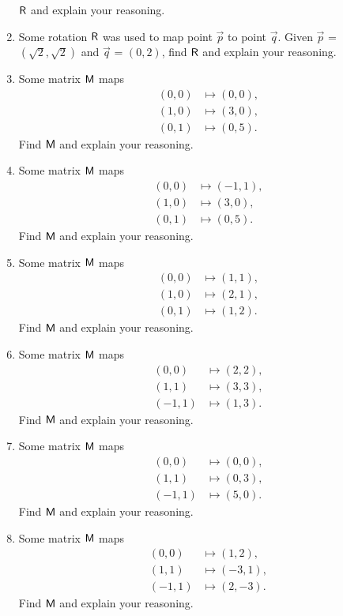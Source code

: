 \begin{enumerate}
  $\mathsf{R}$ and explain your reasoning.
\item Some rotation $\mathsf{R}$ was used to map point $\vec{p}$ to point
  $\vec{q}$.  Given $\vec{p}$ = $(\sqrt{2},\sqrt{2})$ and $\vec{q}$ =
  $(0,2)$, find $\mathsf{R}$ and explain your reasoning.
\item Some matrix $\mathsf{M}$ maps 
\begin{align*}
(0,0) &\mapsto (0,0), \\
(1,0) &\mapsto (3,0), \\
(0,1) &\mapsto (0,5).
\end{align*}
Find $\mathsf{M}$ and explain your reasoning.
\item Some matrix $\mathsf{M}$ maps 
\begin{align*}
(0,0) &\mapsto (-1,1), \\
(1,0) &\mapsto (3,0), \\
(0,1) &\mapsto (0,5).
\end{align*}
Find $\mathsf{M}$ and explain your reasoning.
\item Some matrix $\mathsf{M}$ maps 
\begin{align*}
(0,0) &\mapsto (1,1), \\
(1,0) &\mapsto (2,1), \\
(0,1) &\mapsto (1,2).
\end{align*}
Find $\mathsf{M}$ and explain your reasoning.
\item Some matrix $\mathsf{M}$ maps 
\begin{align*}
(0,0) &\mapsto (2,2), \\
(1,1) &\mapsto (3,3), \\
(-1,1) &\mapsto (1,3).
\end{align*}
Find $\mathsf{M}$ and explain your reasoning.
\item Some matrix $\mathsf{M}$ maps 
\begin{align*}
(0,0) &\mapsto (0,0), \\
(1,1) &\mapsto (0,3), \\
(-1,1) &\mapsto (5,0).
\end{align*}
Find $\mathsf{M}$ and explain your reasoning.
\item Some matrix $\mathsf{M}$ maps 
\begin{align*}
(0,0) &\mapsto (1,2), \\
(1,1) &\mapsto (-3,1), \\
(-1,1) &\mapsto (2,-3).
\end{align*}
Find $\mathsf{M}$ and explain your reasoning.


\end{enumerate}
